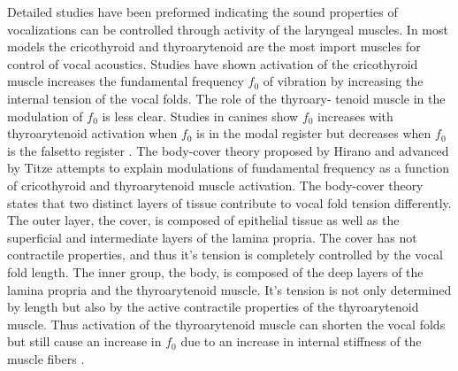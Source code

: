 \documentclass[12pt, letter]{report}
\begin{document}
Detailed studies have been preformed indicating the sound properties of vocalizations can be controlled through activity of the laryngeal muscles. In most models the cricothyroid and thyroarytenoid are the most import muscles for control of vocal acoustics. Studies have shown activation of the cricothyroid muscle increases the fundamental frequency $f_0$ of vibration by increasing the internal tension of the vocal folds. The role of the thyroary- tenoid muscle in the modulation of $f_0$ is less clear. Studies in canines show $f_0$ increases with thyroarytenoid activation when $f_0$ is in the modal register but decreases when $f_0$ is the falsetto register \cite{Berke2010, Titze2000, Choi1993}. The body-cover theory proposed by Hirano and advanced by Titze attempts to explain modulations of fundamental frequency as a function of cricothyroid and thyroarytenoid muscle activation. The body-cover theory states that two distinct layers of tissue contribute to vocal fold tension differently. The outer layer, the cover, is composed of epithelial tissue as well as the superficial and intermediate layers of the lamina propria. The cover has not contractile properties, and thus it’s tension is completely controlled by the vocal fold length. The inner group, the body, is composed of the deep layers of the lamina propria and the thyroarytenoid muscle. It’s tension is not only determined by length but also by the active contractile properties of the thyroarytenoid muscle. Thus activation of the thyroarytenoid muscle can shorten the vocal folds but still cause an increase in $f_0$ due to an increase in internal stiffness of the muscle fibers \cite{Titze1988}.
\end{document}
